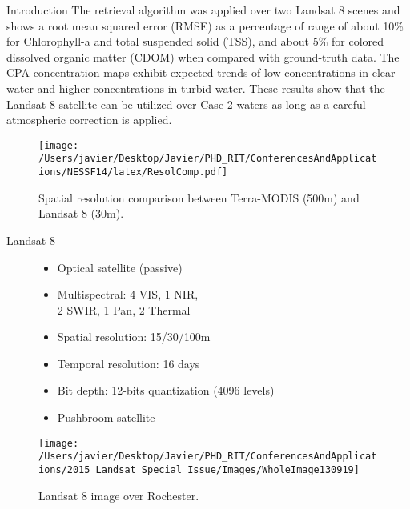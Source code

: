 \documentclass{beamer}
\begin{document}
\begin{frame}{}
\begin{columns}[t]
\begin{column}{.3\linewidth}
\begin{block}{Introduction}
The retrieval algorithm was applied over two Landsat 8 scenes and shows a root mean squared error (RMSE) as a percentage of range of about 10\% for Chlorophyll-a and total suspended solid (TSS), and about 5\% for colored dissolved organic matter (CDOM) when compared with ground-truth data. The CPA concentration maps exhibit expected trends of low concentrations in clear water and higher concentrations in turbid water. These results show that the Landsat 8 satellite can be utilized over Case 2 waters as long as a careful atmospheric correction is applied.\\
\begin{center}
\begin{figure}[H]
\centering
  \texttt{[image: /Users/javier/Desktop/Javier/PHD\_RIT/ConferencesAndApplications/NESSF14/latex/ResolComp.pdf]}
  \caption{Spatial resolution comparison between Terra-MODIS (500m) and Landsat 8 (30m). \label{fig:resol} } 
\end{figure}
\end{center}
\end{block}

      

\begin{block}{Landsat 8}
\begin{figure}[htb]
\begin{minipage}[c]{0.48\linewidth}
\small
\begin{itemize}
  \item Optical satellite (passive)
  \vspace{.2cm}
  \item Multispectral: 4 VIS, 1 NIR, \\2 SWIR, 1 Pan, 2 Thermal
  \vspace{.2cm}
  \item Spatial resolution: 15/30/100m
  \vspace{.2cm}
  \item Temporal resolution: 16 days
  \vspace{.2cm}
  \item Bit depth: 12-bits quantization (4096 levels)
  \vspace{.2cm}
  \item Pushbroom satellite
\end{itemize}
\end{minipage}
\hfill
\begin{minipage}[c]{0.48\linewidth}
    \centering
    \texttt{[image: /Users/javier/Desktop/Javier/PHD\_RIT/ConferencesAndApplications/2015\_Landsat\_Special\_Issue/Images/WholeImage130919]}
  \caption{Landsat 8 image over Rochester. \label{fig:Scene} } 
\end{minipage}
\end{figure}


\end{block}
\end{column}
\end{columns}
\end{frame}
\end{document}
